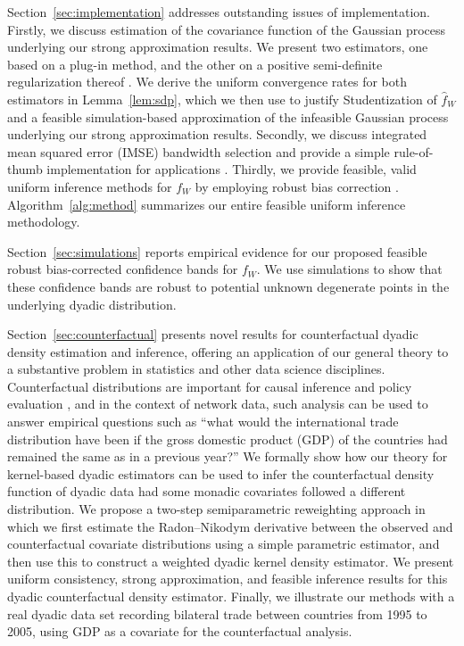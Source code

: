 Section~\ref{sec:implementation} addresses outstanding issues of
implementation. Firstly, we discuss estimation of the covariance function of
the Gaussian process underlying our strong approximation results. We present
two estimators, one based on a plug-in method, and the other on a
positive semi-definite regularization thereof \citep{laurent2005semidefinite}.
We derive the uniform convergence rates for both estimators in
Lemma~\ref{lem:sdp}, which we then use to justify Studentization of $\hat{f}_W$
and a feasible simulation-based approximation of the infeasible Gaussian
process underlying our strong approximation results. Secondly, we discuss
integrated mean squared error (IMSE) bandwidth selection and provide a simple
rule-of-thumb implementation for applications
\citep{wand1994kernel,simonoff1996smoothing}. Thirdly, we provide feasible,
valid uniform inference methods for $f_W$ by employing robust bias correction
\citep{calonico2018effect, calonico2022coverage}. Algorithm~\ref{alg:method}
summarizes our entire feasible uniform inference methodology.

Section~\ref{sec:simulations} reports empirical evidence for our proposed
feasible robust bias-corrected confidence bands for $f_W$. We use simulations
to show that these confidence bands are robust to potential unknown degenerate
points in the underlying dyadic distribution.

Section~\ref{sec:counterfactual} presents novel results for counterfactual
dyadic density estimation and inference, offering an application of our general
theory to a substantive problem in statistics and other data science
disciplines. Counterfactual distributions are important for causal inference
and policy evaluation
\citep{dinardo1996distribution,chernozhukov2013inference}, and in the context
of network data, such analysis can be used to answer empirical questions such
as ``what would the international trade distribution have been if
the gross domestic product (GDP) of the countries had remained the same as in a
previous year?'' We formally show how our theory for kernel-based dyadic
estimators can be used to infer the counterfactual density function of dyadic
data had some monadic covariates followed a different distribution. We propose
a two-step semiparametric reweighting approach in which we first estimate the
Radon--Nikodym derivative between the observed and counterfactual covariate
distributions using a simple parametric estimator, and then use this to
construct a weighted dyadic kernel density estimator. We present uniform
consistency, strong approximation, and feasible inference results for this
dyadic counterfactual density estimator. Finally, we illustrate our
methods with a real dyadic data set recording bilateral trade between
countries from 1995 to 2005, using GDP as a covariate for the
counterfactual analysis.

